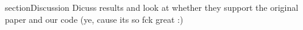 section{Discussion}
Dicuss results and look at whether they support the original paper and our code (ye, cause its so fck great :)
